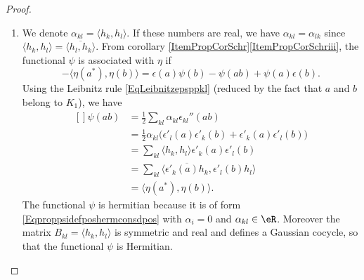 \begin{proof}
    \begin{enumerate}
        \item
            We denote $\alpha_{kl}=\langle h_k, h_l\rangle $. If these numbers are real, we have $\alpha_{kl}=\alpha_{lk}$ since $\langle h_k, h_l\rangle =\overline{ \langle h_l, h_k\rangle  }$. From corollary \ref{ItemPropCorSchr}\ref{ItemPropCorSchriii}, the functional $\psi$ is associated with $\eta$ if
            \begin{equation}
                -\langle \eta(a^*), \eta(b)\rangle =\epsilon(a)\psi(b)-\psi(ab)+\psi(a)\epsilon(b).
            \end{equation}
            Using the Leibnitz rule \eqref{EqLeibnitzepsppkl} (reduced by the fact that $a$ and $b$ belong to $K_1$), we have
            \begin{equation}
                \begin{aligned}[]
                    \psi(ab)&=\frac{ 1 }{2}\sum_{kl}\alpha_{kl}\epsilon_{kl}''(ab)\\
                    &=\frac{ 1 }{2}\alpha_{kl}\big( \epsilon'_l(a)\epsilon'_k(b)+\epsilon'_k(a)\epsilon'_l(b) \big)\\
                    &=\sum_{kl}\langle h_k, h_l\rangle \epsilon'_k(a)\epsilon'_l(b)\\
                    &=\sum_{kl}\langle \overline{ \epsilon'_k(a)h_k }, \epsilon'_l(b)h_l\rangle \\
                    &=\langle \eta(a^*), \eta(b)\rangle .
                \end{aligned}
            \end{equation}
            The functional $\psi$ is hermitian because it is of form \eqref{Eqproppsidefposhermconsdpos} with $\alpha_i=0$ and $\alpha_{kl}\in\eR$. Moreover the matrix $B_{kl}=\langle h_k, h_l\rangle $ is symmetric and real and defines a Gaussian cocycle, so that the functional $\psi$ is Hermitian.


\end{enumerate}
\end{proof}

